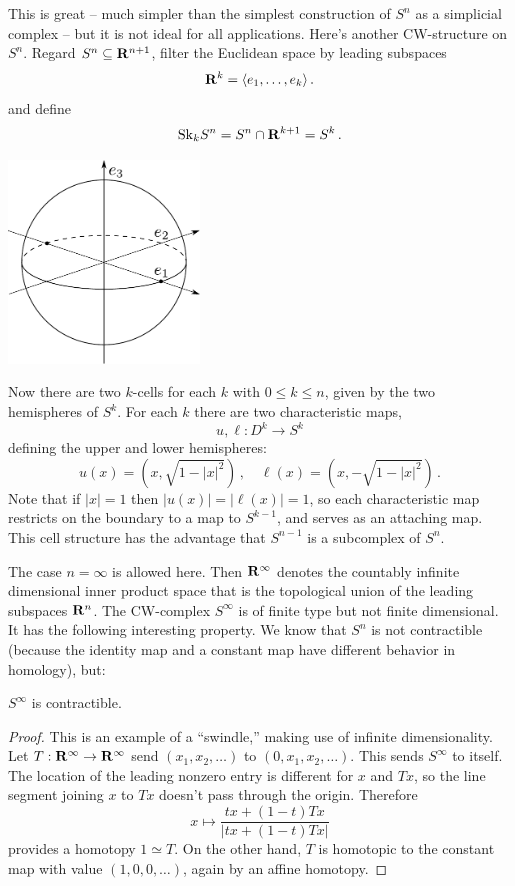 This is great -- much simpler than the simplest construction of $S^n$ as 
a simplicial complex -- but it is not ideal for all applications.  
Here's another CW-structure on $S^n$. Regard $S^n\subseteq\mathbf R^{n+1}$, 
filter the Euclidean space by leading subspaces
\[
\mathbf R^k=\langle e_1,\ldots,e_k\rangle\,.
\]
and define 
\[
\mathrm{Sk}_kS^n=S^n\cap\mathbf R^{k+1}=S^k\,.
\]

\medskip
\begin{center}
\includegraphics[width=2in]{905/Figures/15-sphere-CW-structure.pdf}
\end{center}

Now there are two $k$-cells for each $k$ with $0\leq k\leq n$, given by the
two hemispheres of $S^k$. For each $k$ there are two characteristic maps,
\[
u,\ell:D^k\to S^k 
\]
defining the upper and lower hemispheres:
\[
u(x)=(x,\sqrt{1-|x|^2})\,,\quad\ell(x)=(x,-\sqrt{1-|x|^2})\,.
\]
Note that if $|x|=1$ then $|u(x)|=|\ell(x)|=1$, so each characteristic map
restricts on the boundary to a map to $S^{k-1}$, and serves as an attaching 
map. This cell structure has the advantage that $S^{n-1}$ is a subcomplex 
of $S^n$. 

The case $n=\infty$ is allowed here. Then $\mathbf R^\infty$ denotes the countably
infinite dimensional inner product space that is the topological union of the
leading subspaces $\mathbf R^n$. The CW-complex $S^\infty$ is of finite type but
not finite dimensional. It has the following interesting property. We know that
$S^n$ is not contractible (because the identity map and a constant map have 
different behavior in homology), but: 
\begin{prop}
$S^\infty$ is contractible.
\end{prop}
\begin{proof}
This is an example of a ``swindle,'' making use of infinite dimensionality. 
Let $T:\mathbf R^\infty\to\mathbf R^\infty$ send $(x_1,x_2,\ldots)$ to 
$(0,x_1,x_2,\ldots)$. This sends $S^\infty$ to itself. The location of the 
leading nonzero entry is different for $x$ and $Tx$, so the line segment 
joining $x$ to $Tx$ doesn't pass through the origin. Therefore 
\[
x\mapsto\frac{tx+(1-t)Tx}{|tx+(1-t)Tx|} 
\]
provides a homotopy $1\simeq T$. On the other hand, $T$ is homotopic to the 
constant map with value $(1,0,0,\ldots)$, again by an affine homotopy. 
\end{proof}

